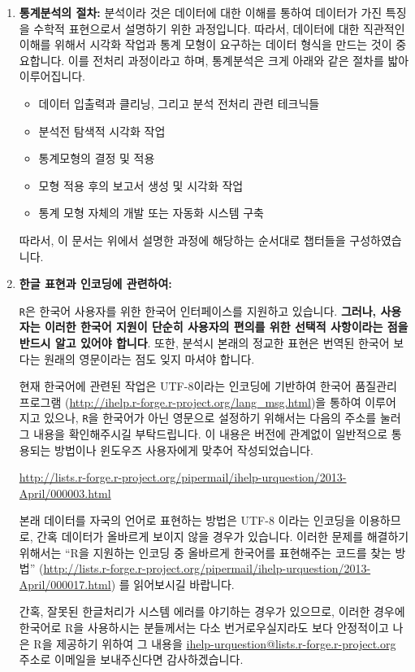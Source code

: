 \documentclass{report}
\begin{document}
\begin{enumerate}
  \item \textbf{통계분석의 절차:} 분석이라 것은 데이터에 대한 이해를 통하여 데이터가 가진 특징을 수학적 표현으로서 설명하기 위한 과정입니다. 
따라서, 데이터에 대한 직관적인 이해를 위해서 시각화 작업과 통계 모형이 요구하는 데이터 형식을 만드는 것이 중요합니다. 
이를 전처리 과정이라고 하며, 통계분석은 크게 아래와 같은 절차를 밟아 이루어집니다.

\begin{itemize}
\item 데이터 입출력과 클리닝, 그리고 분석 전처리 관련 테크닉들
\item 분석전 탐색적 시각화 작업 
\item 통계모형의 결정 및 적용 
\item 모형 적용 후의 보고서 생성 및 시각화 작업
\item 통계 모형 자체의 개발 또는 자동화 시스템 구축
\end{itemize}

따라서, 이 문서는 위에서 설명한 과정에 해당하는 순서대로 챕터들을 구성하였습니다. 


  \item \textbf{한글 표현과 인코딩에 관련하여:}


  \texttt{R}은 한국어 사용자를 위한 한국어 인터페이스를 지원하고 있습니다. 
\textbf{그러나, 사용자는 이러한 한국어 지원이 단순히 사용자의 편의를 위한 선택적 사항이라는 점을 반드시 알고 있어야 합니다}.
또한, 분석시 본래의 정교한 표현은 번역된 한국어 보다는 원래의 영문이라는 점도 잊지 마셔야 합니다. 

현재 한국어에 관련된 작업은 UTF-8이라는 인코딩에 기반하여 한국어 품질관리 프로그램 (\url{http://ihelp.r-forge.r-project.org/lang_msg.html})을 통하여 이루어 지고 있으나, \texttt{R}을 한국어가 아닌 영문으로 설정하기 위해서는 다음의 주소를 눌러 그 내용을 확인해주시길 부탁드립니다. 
이 내용은 버전에 관계없이 일반적으로 통용되는 방법이나 윈도우즈 사용자에게 맞추어 작성되었습니다. 

\url{http://lists.r-forge.r-project.org/pipermail/ihelp-urquestion/2013-April/000003.html}

본래 데이터를 자국의 언어로 표현하는 방법은 UTF-8 이라는 인코딩을 이용하므로, 간혹 데이터가 올바르게 보이지 않을 경우가 있습니다. 
이러한 문제를 해결하기 위해서는 ``R을 지원하는 인코딩 중 올바르게 한국어를 표현해주는 코드를 찾는 방법'' (\url{http://lists.r-forge.r-project.org/pipermail/ihelp-urquestion/2013-April/000017.html}) 를 읽어보시길 바랍니다.

간혹, 잘못된 한글처리가 시스템 에러를 야기하는 경우가 있으므로, 이러한 경우에 한국어로 R을 사용하시는 분들께서는 다소 번거로우실지라도 보다 안정적이고 나은 R을 제공하기 위하여 그 내용을 \href{mailto:ihelp-urquestion@lists.r-forge.r-project.org}{ihelp-urquestion@lists.r-forge.r-project.org} 주소로 이메일을 보내주신다면 감사하겠습니다. 


\end{enumerate}
\end{document}
